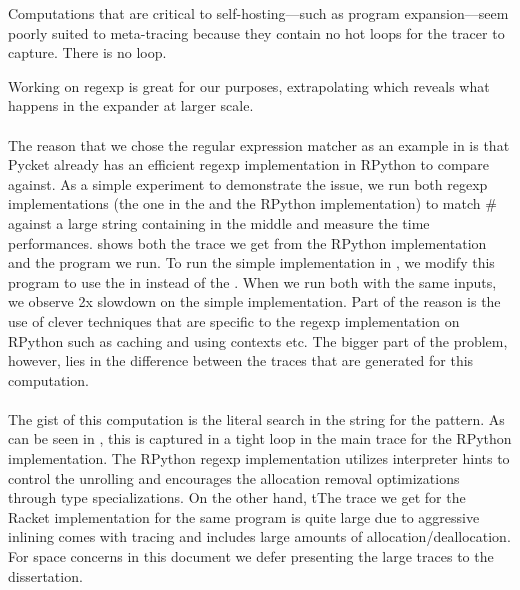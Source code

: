 			\begin{sectionpoint}
				Computations that are critical to self-hosting—such as program expansion—seem poorly suited to meta-tracing because they contain no hot loops for the tracer to capture. There is no loop.

			\end{sectionpoint}


			Working on regexp is great for our purposes, extrapolating which reveals what happens in the expander at larger scale.

			\paragraph{}%
			The reason that we chose the regular expression matcher as an example
			in  is that Pycket already has an efficient regexp
			implementation in RPython to compare against. As a simple experiment
			to demonstrate the issue, we run both regexp implementations (the one
			in the  and the RPython implementation) to match
			$\mathtt{\#}$ against a large string containing
			 in the middle and measure the time
			performances.  shows both the trace we get
			from the RPython implementation and the program we run. To run the
			simple implementation in , we modify this program
			to use the  in instead of the
			. When we run both with the same inputs, we
			observe 2x slowdown on the simple implementation. Part of the reason
			is the use of clever techniques that are specific to the regexp
			implementation on RPython such as caching and using contexts etc. The
			bigger part of the problem, however, lies in the difference between
			the traces that are generated for this computation.

			\paragraph{}%
			The gist of this computation is the literal search in the string for
			the  pattern. As can be seen in
			, this is captured in a tight loop in the
			main trace for the RPython implementation. The RPython regexp
			implementation utilizes interpreter hints to control the unrolling and
			encourages the allocation removal optimizations through type
			specializations. On the other hand, tThe trace we get for the Racket
			implementation for the same program is quite large due to aggressive
			inlining comes with tracing and includes large amounts of
			allocation/deallocation. For space concerns in this document we defer
			presenting the large traces to the dissertation.

